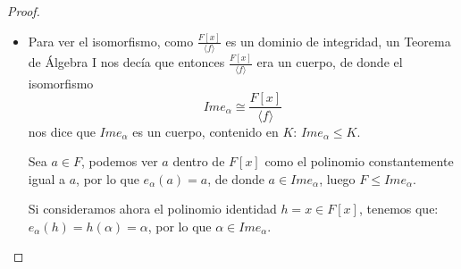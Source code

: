 \begin{prop}
\begin{proof}
\begin{itemize}
            \item Para ver el isomorfismo, como $\frac{F[x]}{\langle f \rangle }$ es un dominio de integridad, un Teorema de Álgebra I nos decía que entonces $\frac{F[x]}{\langle f \rangle }$ era un cuerpo, de donde el isomorfismo
                \begin{equation*}
                    Im e_\alpha \cong \dfrac{F[x]}{\langle f \rangle }
                \end{equation*}
                nos dice que $Im e_\alpha$ es un cuerpo, contenido en $K$: $Im e_\alpha \leq K$.

                Sea $a\in F$, podemos ver $a$ dentro de $F[x]$ como el polinomio constantemente igual a $a$, por lo que $e_\alpha(a) = a$, de donde $a\in Im e_\alpha$, luego $F\leq Im e_\alpha$.

                Si consideramos ahora el polinomio identidad $h=x\in F[x]$, tenemos que: $e_\alpha(h) = h(\alpha) = \alpha$, por lo que $\alpha\in Im e_\alpha$.


\end{itemize}
\end{proof}
\end{prop}
